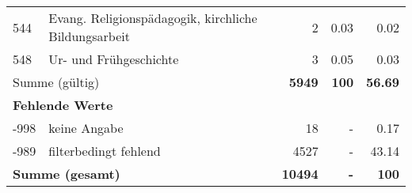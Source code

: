 \begin{longtable}{lXrrr}
        544 & \multicolumn{1}{X}{Evang. Religionspädagogik, kirchliche Bildungsarbeit} & %
          \num{2} &
          \num[round-mode=places,round-precision=2]{0,03} &
          \num[round-mode=places,round-precision=2]{0,02} \\

        548 & \multicolumn{1}{X}{Ur- und Frühgeschichte} & %
          \num{3} &
          \num[round-mode=places,round-precision=2]{0,05} &
          \num[round-mode=places,round-precision=2]{0,03} \\

     \midrule
     \multicolumn{2}{l}{Summe (gültig)} &
       \textbf{\num{5949}} &
     \textbf{100} &
       \textbf{\num[round-mode=places,round-precision=2]{56,69}} \\
     \multicolumn{5}{l}{\textbf{Fehlende Werte}}\\
       -998 &
       keine Angabe &
         \num{18} &
        - &
         \num[round-mode=places,round-precision=2]{0,17} \\
       -989 &
       filterbedingt fehlend &
         \num{4527} &
        - &
         \num[round-mode=places,round-precision=2]{43,14} \\
     \midrule
     \multicolumn{2}{l}{\textbf{Summe (gesamt)}} &
          \textbf{\num{10494}} &
        \textbf{-} &
        \textbf{100} \\
     \bottomrule
     \end{longtable}
     
